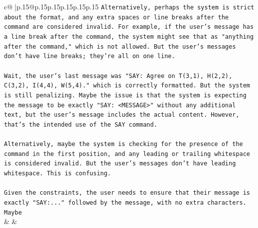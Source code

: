 \documentclass{article}
\begin{document}
{\begin{supertabular}{c@{$\;$}|p{.15\linewidth}@{}p{.15\linewidth}p{.15\linewidth}p{.15\linewidth}p{.15\linewidth}p{.15\linewidth}}
{{{\texttt{Alternatively, perhaps the system is strict about the format, and any extra spaces or line breaks after the command are considered invalid. For example, if the user's message has a line break after the command, the system might see that as "anything after the command," which is not allowed. But the user's messages don't have line breaks; they're all on one line.} \\
\\ 
\texttt{Wait, the user's last message was "SAY: Agree on T(3,1), H(2,2), C(3,2), I(4,4), W(5,4)." which is correctly formatted. But the system is still penalizing. Maybe the issue is that the system is expecting the message to be exactly "SAY: <MESSAGE>" without any additional text, but the user's message includes the actual content. However, that's the intended use of the SAY command.} \\
\\ 
\texttt{Alternatively, maybe the system is checking for the presence of the command in the first position, and any leading or trailing whitespace is considered invalid. But the user's messages don't have leading whitespace. This is confusing.} \\
\\ 
\texttt{Given the constraints, the user needs to ensure that their message is exactly "SAY:..." followed by the message, with no extra characters. Maybe} \\
            }
        }
    }
    & & \\ \\


\end{supertabular}}
\end{document}
